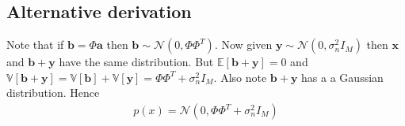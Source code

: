 \documentclass{article}
\newcommand{\ba}{\bm{a}}
\newcommand{\bx}{\bm{x}}
\newcommand{\by}{\bm{y}}
\newcommand{\bb}{\bm{b}}
\begin{document}
\subsection{Alternative derivation}
\label{sec:alt1a}

Note that if $\bb = \Phi \ba$ then $\bb \sim \mathcal{N}(0, \Phi \Phi^T)$. Now given $\by \sim \mathcal{N}(0, \sigma_n^2 I_M)$
then $\bx$ and $\bb + \by$ have the same distribution. But $\mathbb{E}[\bb + \by] = 0$ and
$\mathbb{V}[\bb + \by] = \mathbb{V}[\bb] + \mathbb{V}[\by] = \Phi \Phi^T + \sigma_n^2 I_M$. Also note
$\bb + \by$ has a a Gaussian distribution. Hence
\begin{eqnarray}
  p(x) = \mathcal{N}(0, \Phi \Phi^T + \sigma_n^2 I_M)
\end{eqnarray}
\end{document}
